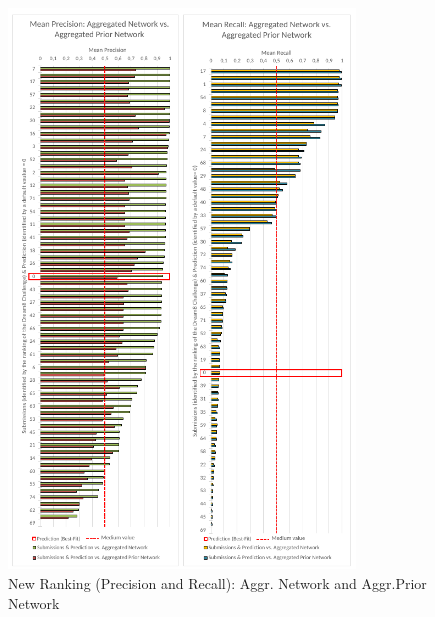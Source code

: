 \begin{figure}[H]
\centering
\includegraphics[width=0.82\textwidth]{./Bilder/Scoring/dreamchallenge/Recall_Precision_vertical_comparison.pdf}
\caption[New Ranking: Precision and Recall]{New Ranking (Precision and Recall): Aggr. Network and Aggr.Prior Network}
\label{fig:}
\end{figure}





